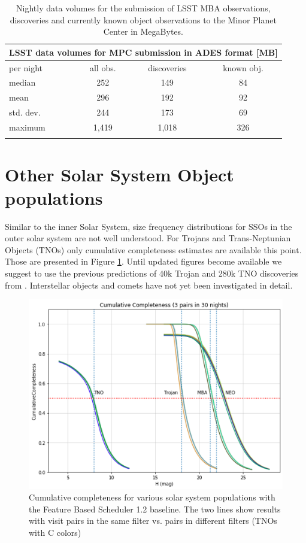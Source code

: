 \begin{table}[tb!]
\begin{center}
\begin{tabular}{lccc}
\multicolumn{4}{c}{LSST data volumes for \gls{MPC} submission in \gls{ADES} format [MB]}\\
\hline\hline
per night & all obs. & discoveries & known obj. \\\hline
median  & 252 &149  &84  \\
mean & 296 & 192 & 92   \\
std. dev. & 244 & 173& 69 \\
maximum & 1,419 & 1,018 & 326 \\
\hline\hline\\
\end{tabular}
\end{center}
\caption{Nightly data volumes for the submission of \gls{LSST} \gls{MBA} observations, discoveries and currently known object observations to the Minor Planet \gls{Center} in MegaBytes.}
\label{tab:data_stats}
\end{table}

\section{Other Solar System \gls{Object} populations}\label{sec:other}
Similar to the inner Solar System, size frequency distributions for SSOs in the outer solar system are not well understood. 
For Trojans and Trans-Neptunian Objects (TNOs) only cumulative completeness estimates are available this point. Those are presented in Figure \ref{fig:allcum}.
Until updated figures become available we suggest to use the previous predictions of 40k Trojan and 280k \gls{TNO} discoveries from \citet{jones2015asteroid}.
Interstellar objects and comets have not yet been investigated in detail.

\begin{figure}[tb!]
\begin{center}
\includegraphics[width=0.60\linewidth]{figs/allcum.png}
\end{center}
\caption{Cumulative completeness for various solar system populations with the Feature Based Scheduler 1.2 baseline.
The two lines show results with visit pairs in the same filter vs. pairs in different filters (TNOs with C colors)}
\label{fig:allcum}       %
\end{figure}


